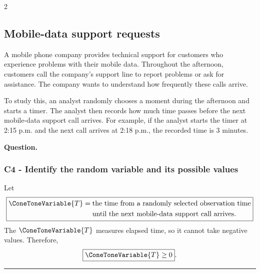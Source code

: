 \begin{multicols}{2}

\subsection{Mobile-data support requests}\label{sec:c4-identify-callcenter}

A mobile phone company provides technical support for customers who
experience problems with their mobile data. Throughout the afternoon, customers call the company's support line to report problems or ask for assistance. The company wants to understand how frequently these calls arrive.

To study this, an analyst randomly chooses a moment during the afternoon and starts a timer. The analyst then records how much time passes before the next mobile-data support call arrives. For example, if the analyst starts the timer at 2:15 p.m. and the next call arrives at 2:18 p.m., the recorded time is
3 minutes.


\textbf{Question.}
\begin{enumerate}
\end{enumerate}

\columnbreak

\subsubsection*{C4 - Identify the random variable and its possible values}\label{subsec:c4-identify-callcenter-a}
Let
\[
\boxed{
	\begin{aligned}
		\ConeToneVariable{T}={}&\text{the time from a randomly selected observation time}\\
		&\text{until the next mobile-data support call arrives.}
\end{aligned}}
\]
The   $\ConeToneVariable{T}$ measures elapsed time, so it cannot take negative
values. Therefore,
$$
\boxed{\ConeToneVariable{T}\geq0}.
$$

\end{multicols}

\noindent\rule{\textwidth}{0.4pt}

\newpage


